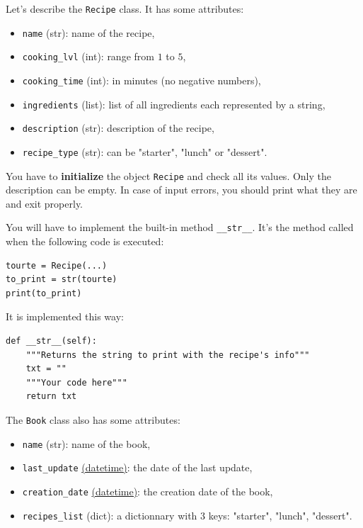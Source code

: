 \documentclass{42-en}
\begin{document}
Let's describe the \texttt{Recipe} class. It has some attributes:
\begin{itemize}
  \item \texttt{name} (str): name of the recipe,
  \item \texttt{cooking\_lvl} (int): range from $1$ to $5$,
  \item \texttt{cooking\_time} (int): in minutes (no negative numbers),
  \item \texttt{ingredients} (list): list of all ingredients each represented by a string,
  \item \texttt{description} (str): description of the recipe,
  \item \texttt{recipe\_type} (str): can be "starter", "lunch" or "dessert".
\end{itemize}

You have to \textbf{initialize} the object \texttt{Recipe} and check all its values. Only the description can be empty.
In case of input errors, you should print what they are and exit properly.

You will have to implement the built-in method \texttt{\_\_str\_\_}.
It's the method called when the following code is executed:

\begin{verbatim}
tourte = Recipe(...)
to_print = str(tourte)
print(to_print)
\end{verbatim}

It is implemented this way:

\begin{verbatim}
def __str__(self):
    """Returns the string to print with the recipe's info"""
    txt = ""
    """Your code here"""
    return txt
\end{verbatim}

The \texttt{Book} class also has some attributes:
\begin{itemize}
  \item \texttt{name} (str): name of the book,
  \item \texttt{last\_update} \href{https://docs.python.org/3/library/datetime.html}{(datetime)}: the date of the last update,
  \item \texttt{creation\_date} \href{https://docs.python.org/3/library/datetime.html}{(datetime)}: the creation date of the book,
  \item \texttt{recipes\_list} (dict): a dictionnary with 3 keys: "starter", "lunch", "dessert".
\end{itemize}
\end{document}
